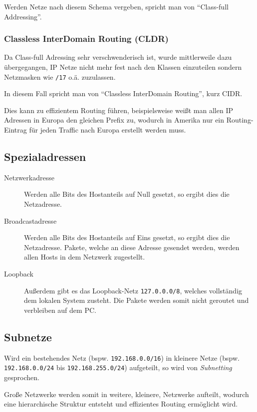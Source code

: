            Werden Netze nach diesem Schema vergeben, spricht man von \enquote{Class-full Addressing}.

            \subsubsection{Classless InterDomain Routing (CLDR)}
                Da Class-full Adressing sehr verschwenderisch ist, wurde mittlerweile dazu übergegangen, IP Netze nicht mehr fest nach den Klassen einzuteilen sondern Netzmasken wie \texttt{/17} o.ä. zuzulassen.
                
                In diesem Fall spricht man von \enquote{Classless InterDomain Routing}, kurz CIDR.
                
                Dies kann zu effizientem Routing führen, beispielsweise weißt man allen IP Adressen in Europa den gleichen Prefix zu, wodurch in Amerika nur ein Routing-Eintrag für jeden Traffic nach Europa erstellt werden muss.

        \subsection{Spezialadressen}
            \begin{description}
            	\item[Netzwerkadresse] Werden alle Bits des Hostanteils auf Null gesetzt, so ergibt dies die Netzadresse.
            	\item[Broadcastadresse] Werden alle Bits des Hostanteils auf Eins gesetzt, so ergibt dies die Netzadresse. Pakete, welche an diese Adresse gesendet werden, werden allen Hosts in dem Netzwerk zugestellt.
            	\item[Loopback] Außerdem gibt es das Loopback-Netz \texttt{127.0.0.0/8}, welches vollständig dem lokalen System zusteht. Die Pakete werden somit nicht geroutet und verbleiben auf dem PC.
            \end{description}

        \subsection{Subnetze}
            Wird ein bestehendes Netz (bspw. \texttt{192.168.0.0/16}) in kleinere Netze (bspw. \texttt{192.168.0.0/24} bis \texttt{192.168.255.0/24}) aufgeteilt, so wird von \textit{Subnetting} gesprochen.
            
            Große Netzwerke werden somit in weitere, kleinere, Netzwerke aufteilt, wodurch eine hierarchische Struktur entsteht und effizientes Routing ermöglicht wird.

